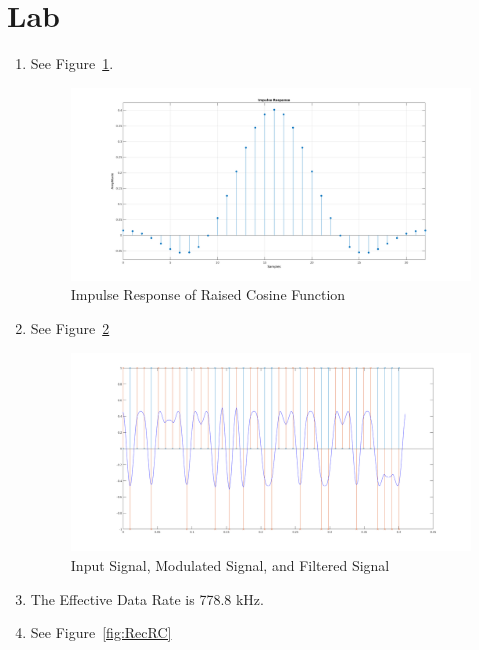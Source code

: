 \documentclass{article}
\begin{document}
\section{Lab}
\label{sec:lab}
\begin{enumerate}
\item[2.] See Figure~\ref{fig:ImpulseResRC}.

\begin{figure}[ht]
\centering
\includegraphics[width=\linewidth]{ImpulseResRC.png}
\caption{Impulse Response of Raised Cosine Function}
\label{fig:ImpulseResRC}
\end{figure}

\item[4.] See Figure~\ref{fig:TransRC}

\begin{figure}[ht]
\centering
\includegraphics[width=\linewidth]{TransRC.png}
\caption{Input Signal, Modulated Signal, and Filtered Signal}
\label{fig:TransRC}
\end{figure}

\item[5.]
The Effective Data Rate is 778.8 kHz.

\item[7.] See Figure~\ref{fig:RecRC}


\end{enumerate}
\end{document}
